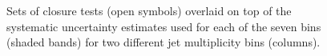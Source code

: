 \begin{figure}[h!]
  \begin{center}
     \\
     ~~
     \\
    \caption{Sets of closure tests (open symbols) overlaid on top of
      the systematic uncertainty estimates used for each of the seven
      \scalht bins (shaded bands) for two different jet multiplicity bins (columns).}
    \label{fig:closure}
  \end{center} 
\end{figure}

